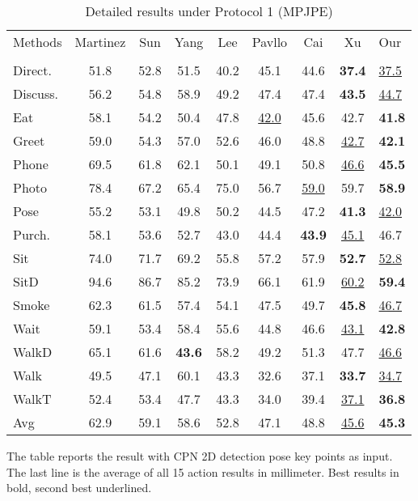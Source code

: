 \documentclass[runningheads]{llncs}
\begin{document}
\begin{table}[!htp]
\centering
\caption{Detailed results under Protocol 1 (MPJPE)}\label{tab1}
\setlength{\tabcolsep}{7.5pt} \renewcommand{\arraystretch}{1} \begin{threeparttable}
\begin{tabular}{|l|ccccccc|l|}
\hline 
Methods & Martinez& Sun & Yang & Lee & Pavllo & Cai & Xu&Our\\
& \cite{MartinezHRL17}&\cite{Sun_2017_ICCV}&\cite{Yang_2018_CVPR}&\cite{Lee_2018_ECCV}&\cite{temporal_convolutions_and_semi_supervised}&\cite{Cai_2019_ICCV}&\cite{Xu_2020_CVPR}&\\
\hline
Direct.&51.8&52.8&51.5&40.2&45.1&44.6&\textbf{37.4}&\underline{37.5}\\
Discuss.&56.2&54.8& 58.9&49.2&47.4& 47.4&\textbf{43.5}&\underline{44.7}\\
Eat& 58.1&54.2&50.4& 47.8&\underline{42.0}& 45.6&42.7&\textbf{41.8}\\
Greet&59.0&54.3& 57.0&52.6& 46.0& 48.8&\underline{42.7}&\textbf{42.1}\\
Phone &69.5& 61.8& 62.1&50.1&49.1& 50.8&\underline{46.6}&\textbf{45.5}\\
Photo &78.4&67.2&65.4&75.0&56.7& \underline{59.0}&59.7&\textbf{58.9}\\
Pose &55.2&53.1&49.8& 50.2&44.5&  47.2&\textbf{41.3}&\underline{42.0}\\
Purch. &58.1& 53.6&52.7&43.0& 44.4&\textbf{43.9}&\underline{45.1}&46.7\\
Sit&74.0&71.7&69.2&55.8&  57.2& 57.9&\textbf{52.7}&\underline{52.8}\\
SitD &94.6&86.7&85.2&73.9&66.1&61.9&\underline{60.2}&\textbf{59.4}\\
Smoke &62.3& 61.5&57.4& 54.1&47.5&49.7&\textbf{45.8}&\underline{46.7}\\
Wait &59.1&53.4&58.4& 55.6&44.8& 46.6&\underline{43.1}&\textbf{42.8}\\
WalkD &65.1&61.6&\textbf{43.6}&58.2&49.2& 51.3&47.7&\underline{46.6}\\
Walk &49.5&47.1& 60.1&43.3&32.6& 37.1&\textbf{33.7}&\underline{34.7}\\
WalkT &52.4&53.4& 47.7&43.3&34.0& 39.4&\underline{37.1}&\textbf{36.8}\\
\hline
Avg&62.9&59.1&58.6&52.8&47.1&48.8&\underline{45.6}&\textbf{45.3}\\
\hline
\end{tabular}
\begin{tablenotes}
        \footnotesize
        \item *The table reports the result with CPN 2D detection pose key points as input. The last line is the average of all 15 action results in millimeter. Best results in bold, second best underlined.
\end{tablenotes}
\end{threeparttable}
\end{table}
\end{document}
